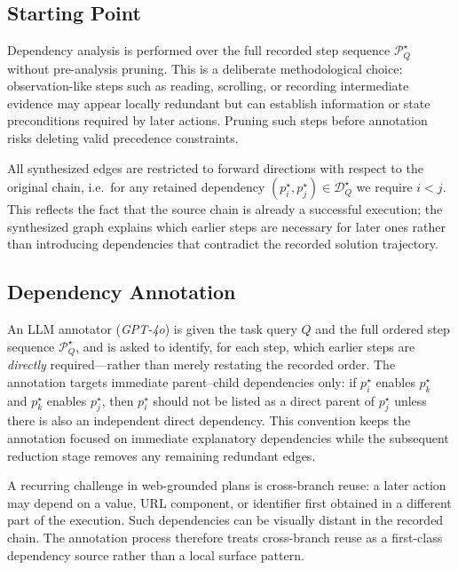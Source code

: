 \documentclass{article}
\providecommand{\model}[1]{\emph{#1}}
\begin{document}
\subsection{Starting Point}
\label{subsec:appendix-synth-start}

Dependency analysis is performed over the full recorded step sequence
$\mathcal{P}_Q^\star$ without pre-analysis pruning. This is a deliberate
methodological choice: observation-like steps such as reading, scrolling, or
recording intermediate evidence may appear locally redundant but can establish
information or state preconditions required by later actions. Pruning such steps
before annotation risks deleting valid precedence constraints.

All synthesized edges are restricted to forward directions with respect to the
original chain, i.e.\ for any retained dependency $(p_i^\star, p_j^\star) \in
\mathcal{D}_Q^\star$ we require $i < j$. This reflects the fact that the source
chain is already a successful execution; the synthesized graph explains which
earlier steps are necessary for later ones rather than introducing dependencies
that contradict the recorded solution trajectory.

\subsection{Dependency Annotation}
\label{subsec:appendix-synth-annotation}

An LLM annotator (\model{GPT-4o}) is given the task query $Q$ and the full ordered
step sequence $\mathcal{P}_Q^\star$, and is asked to identify, for each step,
which earlier steps are \emph{directly} required---rather than merely restating
the recorded order. The annotation targets immediate parent--child dependencies
only: if $p_i^\star$ enables $p_k^\star$ and $p_k^\star$ enables $p_j^\star$,
then $p_i^\star$ should not be listed as a direct parent of $p_j^\star$ unless
there is also an independent direct dependency. This convention keeps the
annotation focused on immediate explanatory dependencies while the subsequent
reduction stage removes any remaining redundant edges.

A recurring challenge in web-grounded plans is cross-branch reuse: a later
action may depend on a value, URL component, or identifier first obtained in a
different part of the execution. Such dependencies can be visually distant in
the recorded chain. The annotation process therefore treats cross-branch reuse
as a first-class dependency source rather than a local surface pattern.
\end{document}
